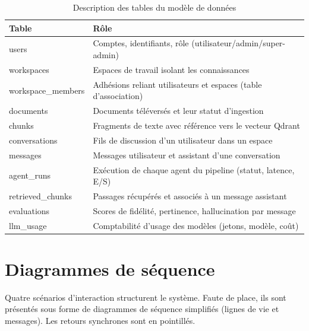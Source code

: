 \documentclass[12pt,a4paper,oneside]{report}
\begin{document}
\begin{table}[H]
\centering
\caption{Description des tables du modèle de données}
\label{tab:tables}
\small
\begin{tabularx}{\textwidth}{@{}>{\ttfamily}l X@{}}
\toprule
\normalfont\textbf{Table} & \textbf{Rôle} \\
\midrule
users              & Comptes, identifiants, rôle (utilisateur/admin/super-admin) \\
workspaces         & Espaces de travail isolant les connaissances \\
workspace\_members & Adhésions reliant utilisateurs et espaces (table d'association) \\
documents          & Documents téléversés et leur statut d'ingestion \\
chunks             & Fragments de texte avec référence vers le vecteur Qdrant \\
conversations      & Fils de discussion d'un utilisateur dans un espace \\
messages           & Messages utilisateur et assistant d'une conversation \\
agent\_runs        & Exécution de chaque agent du pipeline (statut, latence, E/S) \\
retrieved\_chunks  & Passages récupérés et associés à un message assistant \\
evaluations        & Scores de fidélité, pertinence, hallucination par message \\
llm\_usage         & Comptabilité d'usage des modèles (jetons, modèle, coût) \\
\bottomrule
\end{tabularx}
\end{table}

\section{Diagrammes de séquence}
Quatre scénarios d'interaction structurent le système. Faute de place, ils sont
présentés sous forme de diagrammes de séquence simplifiés (lignes de vie et
messages). Les retours synchrones sont en pointillés.
\end{document}
